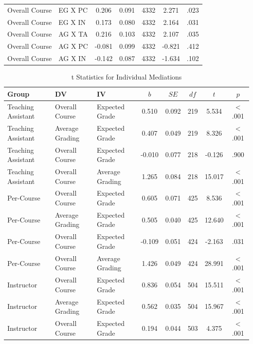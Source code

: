 \documentclass[man]{apa6}
\theoremstyle{definition}
\theoremstyle{definition}
\theoremstyle{definition}
\theoremstyle{remark}
\begin{document}
\begin{table}[tbp]
\begin{center}
\begin{threeparttable}
{\begin{tabular}{llccccc}
Overall Course & EG X PC & 0.206 & 0.091 & 4332 & 2.271 & .023\\
Overall Course & EG X IN & 0.173 & 0.080 & 4332 & 2.164 & .031\\
Overall Course & AG X TA & 0.216 & 0.103 & 4332 & 2.107 & .035\\
Overall Course & AG X PC & -0.081 & 0.099 & 4332 & -0.821 & .412\\
Overall Course & AG X IN & -0.142 & 0.087 & 4332 & -1.634 & .102\\
\bottomrule
\end{tabular}
}
\end{threeparttable}
\end{center}
\end{table}

\begin{table}[tbp]
\begin{center}
\begin{threeparttable}
\caption{\label{tab:table-med-split}t Statistics for Individual Mediations}
\small{
\begin{tabular}{lllccccc}
\toprule
Group & DV & IV & $b$ & $SE$ & $df$ & $t$ & $p$\\
\midrule
Teaching Assistant & Overall Course & Expected Grade & 0.510 & 0.092 & 219 & 5.534 & < .001\\
Teaching Assistant & Average Grading & Expected Grade & 0.407 & 0.049 & 219 & 8.326 & < .001\\
Teaching Assistant & Overall Course & Expected Grade & -0.010 & 0.077 & 218 & -0.126 & .900\\
Teaching Assistant & Overall Course & Average Grading & 1.265 & 0.084 & 218 & 15.017 & < .001\\
Per-Course & Overall Course & Expected Grade & 0.605 & 0.071 & 425 & 8.536 & < .001\\
Per-Course & Average Grading & Expected Grade & 0.505 & 0.040 & 425 & 12.640 & < .001\\
Per-Course & Overall Course & Expected Grade & -0.109 & 0.051 & 424 & -2.163 & .031\\
Per-Course & Overall Course & Average Grading & 1.426 & 0.049 & 424 & 28.991 & < .001\\
Instructor & Overall Course & Expected Grade & 0.836 & 0.054 & 504 & 15.511 & < .001\\
Instructor & Average Grading & Expected Grade & 0.562 & 0.035 & 504 & 15.967 & < .001\\
Instructor & Overall Course & Expected Grade & 0.194 & 0.044 & 503 & 4.375 & < .001\\

\end{tabular}}
\end{threeparttable}
\end{center}
\end{table}
\end{document}
